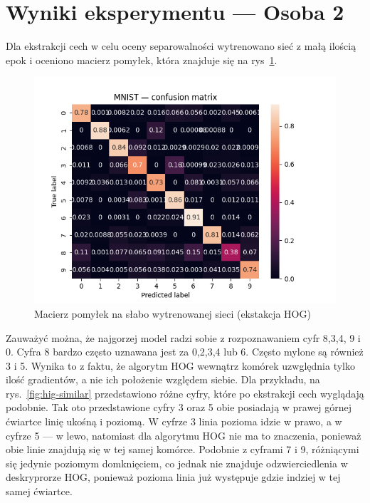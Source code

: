 \documentclass[10pt]{article}
\begin{document}
\pagebreak

\section{Wyniki eksperymentu --- Osoba 2}

Dla ekstrakcji cech w celu oceny separowalności wytrenowano sieć z małą ilością epok i oceniono macierz pomyłek, która znajduje się na rys~\ref{fig:hog-bad-cm}.

\begin{figure}[H]\centering
    \includegraphics[width=.3\linewidth]{img/mnist_hog_bad_cm.png}
    \caption{Macierz pomyłek na słabo wytrenowanej sieci (ekstakcja HOG)}\label{fig:hog-bad-cm}
\end{figure}

Zauważyć można, że najgorzej model radzi sobie z rozpoznawaniem cyfr 8,3,4, 9 i 0.
Cyfra 8 bardzo często uznawana jest za 0,2,3,4 lub 6.
Często mylone są również 3 i 5.
Wynika to z faktu, że algorytm HOG wewnątrz komórek uzwględnia tylko ilość gradientów, a nie ich położenie względem siebie.
Dla przykładu, na rys.~\ref{fig:hig-similar} przedstawiono różne cyfry, które po ekstrakcji cech wyglądają podobnie.
Tak oto przedstawione cyfry 3 oraz 5 obie posiadają w prawej górnej ćwiartce linię ukośną i poziomą.
W cyfrze 3 linia pozioma idzie w prawo, a w cyfrze 5 --- w lewo, natomiast dla algorytmu HOG nie ma to znaczenia, ponieważ obie linie znajdują się w tej samej komórce.
Podobnie z cyframi 7 i 9, różniącymi się jedynie poziomym domknięciem, co jednak nie znajduje odzwierciedlenia w deskryprorze HOG, ponieważ pozioma linia już występuje gdzie indziej w tej samej ćwiartce.
\end{document}
